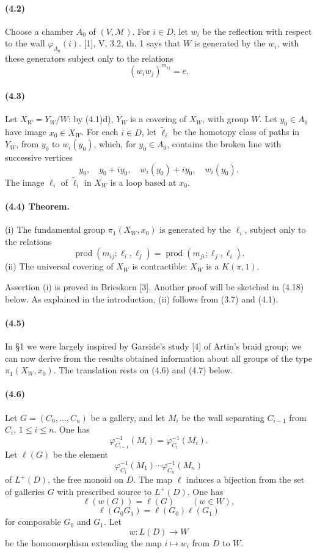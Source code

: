 \documentclass[10pt]{article}
\newcommand{\prodalt}{\operatorname{prod}}
\begin{document}
\paragraph{(4.2)} Choose a chamber \(A_0\) of \((V,\mathcal M)\). For \(i\in D\), let \(w_i\) be the reflection with respect to the wall \(\varphi_{A_0}(i)\). [1], V, 3.2, th. 1 says that \(W\) is generated by the \(w_i\), with these generators subject only to the relations
\[
(w_iw_j)^{m_{ij}}=e.
\]

\paragraph{(4.3)} Let \(X_W=Y_W/W\): by (4.1)d), \(Y_W\) is a covering of \(X_W\), with group \(W\). Let \(y_0\in A_0\) have image \(x_0\in X_W\). For each \(i\in D\), let \(\widetilde \ell_i\) be the homotopy class of paths in \(Y_W\), from \(y_0\) to \(w_i(y_0)\), which, for \(y_0\in A_0\), contains the broken line with successive vertices
\[
y_0,\quad y_0+iy_0,\quad w_i(y_0)+iy_0,\quad w_i(y_0).
\]
The image \(\ell_i\) of \(\widetilde\ell_i\) in \(X_W\) is a loop based at \(x_0\).

\paragraph{(4.4) Theorem.} (i) The fundamental group \(\pi_1(X_W,x_0)\) is generated by the \(\ell_i\), subject only to the relations
\[
\tag{4.4.1}
\prodalt(m_{ij};\ell_i,\ell_j)=\prodalt(m_{ji};\ell_j,\ell_i).
\]
(ii) The universal covering of \(X_W\) is contractible: \(X_W\) is a \(K(\pi,1)\).

Assertion (i) is proved in Brieskorn [3]. Another proof will be sketched in (4.18) below. As explained in the introduction, (ii) follows from (3.7) and (4.1).

\paragraph{(4.5)} In §1 we were largely inspired by Garside's study [4] of Artin's braid group; we can now derive from the results obtained information about all groups of the type \(\pi_1(X_W,x_0)\). The translation rests on (4.6) and (4.7) below.

\paragraph{(4.6)} Let \(G=(C_0,\ldots,C_n)\) be a gallery, and let \(M_i\) be the wall separating \(C_{i-1}\) from \(C_i\), \(1\le i\le n\). One has
\[
\varphi^{-1}_{C_{i-1}}(M_i)=\varphi^{-1}_{C_i}(M_i).
\]
Let \(\ell(G)\) be the element
\[
\varphi^{-1}_{C_1}(M_1)\cdots \varphi^{-1}_{C_n}(M_n)
\]
of \(L^+(D)\), the free monoid on \(D\). The map \(\ell\) induces a bijection from the set of galleries \(G\) with prescribed source to \(L^+(D)\). One has
\[
\tag{4.6.1}
\ell(w(G))=\ell(G)\qquad(w\in W),
\]
\[
\tag{4.6.2}
\ell(G_0G_1)=\ell(G_0)\ell(G_1)
\]
for composable \(G_0\) and \(G_1\). Let
\[
w:L(D)\longrightarrow W
\]
be the homomorphism extending the map \(i\mapsto w_i\) from \(D\) to \(W\).
\end{document}
